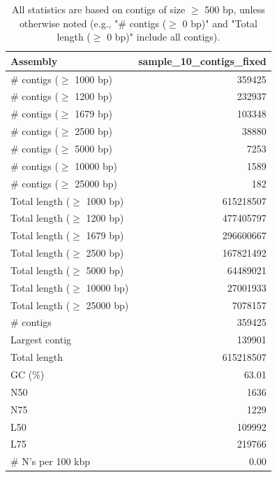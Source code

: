 \documentclass[12pt,a4paper]{article}
\begin{document}
\begin{table}[ht]
\begin{center}
\caption{All statistics are based on contigs of size $\geq$ 500 bp, unless otherwise noted (e.g., "\# contigs ($\geq$ 0 bp)" and "Total length ($\geq$ 0 bp)" include all contigs).}
\begin{tabular}{|l*{1}{|r}|}
\hline
Assembly & sample\_10\_contigs\_fixed \\ \hline
\# contigs ($\geq$ 1000 bp) & 359425 \\ \hline
\# contigs ($\geq$ 1200 bp) & 232937 \\ \hline
\# contigs ($\geq$ 1679 bp) & 103348 \\ \hline
\# contigs ($\geq$ 2500 bp) & 38880 \\ \hline
\# contigs ($\geq$ 5000 bp) & 7253 \\ \hline
\# contigs ($\geq$ 10000 bp) & 1589 \\ \hline
\# contigs ($\geq$ 25000 bp) & 182 \\ \hline
Total length ($\geq$ 1000 bp) & 615218507 \\ \hline
Total length ($\geq$ 1200 bp) & 477405797 \\ \hline
Total length ($\geq$ 1679 bp) & 296600667 \\ \hline
Total length ($\geq$ 2500 bp) & 167821492 \\ \hline
Total length ($\geq$ 5000 bp) & 64489021 \\ \hline
Total length ($\geq$ 10000 bp) & 27001933 \\ \hline
Total length ($\geq$ 25000 bp) & 7078157 \\ \hline
\# contigs & 359425 \\ \hline
Largest contig & 139901 \\ \hline
Total length & 615218507 \\ \hline
GC (\%) & 63.01 \\ \hline
N50 & 1636 \\ \hline
N75 & 1229 \\ \hline
L50 & 109992 \\ \hline
L75 & 219766 \\ \hline
\# N's per 100 kbp & 0.00 \\ \hline
\end{tabular}
\end{center}
\end{table}
\end{document}
